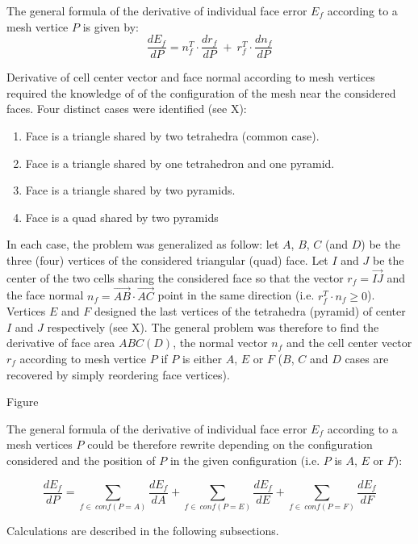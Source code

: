\documentclass[11pt]{article}
\begin{document}
The general formula of the derivative of individual face error $E_f$ according to a mesh vertice $P$ is given by:
\begin{equation}
\frac{dE_f}{dP} = n_f^T \cdot \frac{d r_f}{dP}\ +\ r_f^T \cdot \frac{d n_f}{dP}
\end{equation}

Derivative of cell center vector and face normal according to mesh vertices required the knowledge of of the configuration of the mesh near the considered faces. Four distinct cases were identified (see X):
\begin{enumerate}
  \item Face is a triangle shared by two tetrahedra (common case). 
  \item Face is a triangle shared by one tetrahedron and one pyramid.
  \item Face is a triangle shared by two pyramids.
  \item Face is a quad shared by two pyramids
\end{enumerate}

In each case, the problem was generalized as follow: let $A$, $B$, $C$ (and $D$) be the three (four) vertices of the considered triangular (quad) face. 
Let $I$ and $J$ be the center of the two cells sharing the considered face so that the vector $r_f = \overrightarrow{IJ}$ and the face normal $n_f = \overrightarrow{AB} \cdot \overrightarrow{AC}$ point in the same direction (i.e. $r_f^T \cdot n_f \geq 0$).
Vertices $E$ and $F$ designed the last vertices of the tetrahedra (pyramid) of center $I$ and $J$ respectively (see X).
The general problem was therefore to find the derivative of face area $ABC(D)$, the normal vector $n_f$ and the cell center vector $r_f$ according to mesh vertice $P$ if $P$ is either $A$, $E$ or $F$ ($B$, $C$ and $D$ cases are recovered by simply reordering face vertices). 

Figure

The general formula of the derivative of individual face error $E_f$ according to a mesh vertices $P$ could be therefore rewrite depending on the configuration considered and the position of $P$ in the given configuration (i.e. $P$ is $A$, $E$ or $F$):

\begin{equation}
\frac{dE_f}{dP} = \sum_{f\in\ conf(P=A)} \frac{dE_f}{dA} + \sum_{f\in\ conf(P=E)} \frac{dE_f}{dE} +
\sum_{f\in\ conf(P=F)} \frac{dE_f}{dF} 
\end{equation}

Calculations are described in the following subsections.
\end{document}

